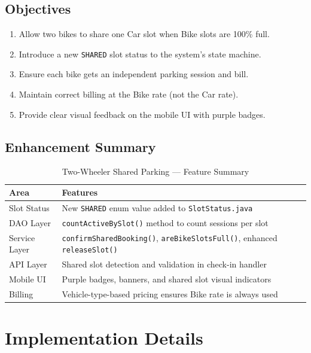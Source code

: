 \documentclass[12pt,a4paper]{article}
\begin{document}
\subsection{Objectives}
\begin{enumerate}[noitemsep]
    \item Allow two bikes to share one Car slot when Bike slots are 100\% full.
    \item Introduce a new \texttt{SHARED} slot status to the system's state machine.
    \item Ensure each bike gets an independent parking session and bill.
    \item Maintain correct billing at the Bike rate (not the Car rate).
    \item Provide clear visual feedback on the mobile UI with purple badges.
\end{enumerate}

\subsection{Enhancement Summary}

\begin{table}[H]
\centering
\caption{Two-Wheeler Shared Parking — Feature Summary}
\begin{tabularx}{\textwidth}{|l|X|}
\hline
\textbf{Area} & \textbf{Features} \\
\hline
Slot Status & New \texttt{SHARED} enum value added to \texttt{SlotStatus.java} \\
\hline
DAO Layer & \texttt{countActiveBySlot()} method to count sessions per slot \\
\hline
Service Layer & \texttt{confirmSharedBooking()}, \texttt{areBikeSlotsFull()}, enhanced \texttt{releaseSlot()} \\
\hline
API Layer & Shared slot detection and validation in check-in handler \\
\hline
Mobile UI & Purple badges, banners, and shared slot visual indicators \\
\hline
Billing & Vehicle-type-based pricing ensures Bike rate is always used \\
\hline
\end{tabularx}
\end{table}

\section{Implementation Details}
\end{document}
